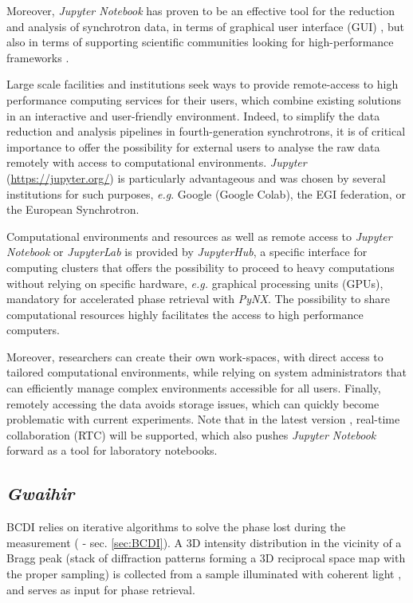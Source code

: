 Moreover, \textit{Jupyter Notebook} has proven to be an effective tool for the reduction and analysis of synchrotron data, in terms of graphical user interface (GUI) \parencite{Martini2019a,Simonne2020}, but also in terms of supporting scientific communities looking for high-performance frameworks \parencite{jupyter_computing_4, jupyter_computing_1, jupyter_computing_3, jupyter_computing_2}.

Large scale facilities and institutions seek ways to provide remote-access to high performance computing services for their users, which combine existing solutions in an interactive and user-friendly environment.
Indeed, to simplify the data reduction and analysis pipelines in fourth-generation synchrotrons, it is of critical importance to offer the possibility for external users to analyse the raw data remotely with access to computational environments.
\textit{Jupyter} (\url{https://jupyter.org/}) is particularly advantageous and was chosen by several institutions for such purposes, \textit{e.g}. Google (Google Colab), the EGI federation, or the European Synchrotron.

Computational environments and resources as well as remote access to \textit{Jupyter Notebook} or \textit{JupyterLab} is provided by \textit{JupyterHub}, a specific interface for computing clusters that offers the possibility to proceed to heavy computations without relying on specific hardware, \textit{e.g.} graphical processing units (GPUs), mandatory for accelerated phase retrieval with \textit{PyNX}.
The possibility to share computational resources highly facilitates the access to high performance computers.

Moreover, researchers can create their own work-spaces, with direct access to tailored computational environments, while relying on system administrators that can efficiently manage complex environments accessible for all users.
Finally, remotely accessing the data avoids storage issues, which can quickly become problematic with current experiments.
Note that in the latest version \parencite{JupyterNotebook7}, real-time collaboration (RTC) will be supported, which also pushes \textit{Jupyter Notebook} forward as a tool for laboratory notebooks.

\subsection{\textit{Gwaihir}} \label{sec:Gwaihir}

BCDI relies on iterative algorithms to solve the phase lost during the measurement (\cite{Robinson2009} - sec. \ref{sec:BCDI}).
A 3D intensity distribution in the vicinity of a Bragg peak (stack of diffraction patterns forming a 3D reciprocal space map with the proper sampling) is collected from a sample illuminated with coherent light \parencite{Robinson2005}, and serves as input for phase retrieval.

